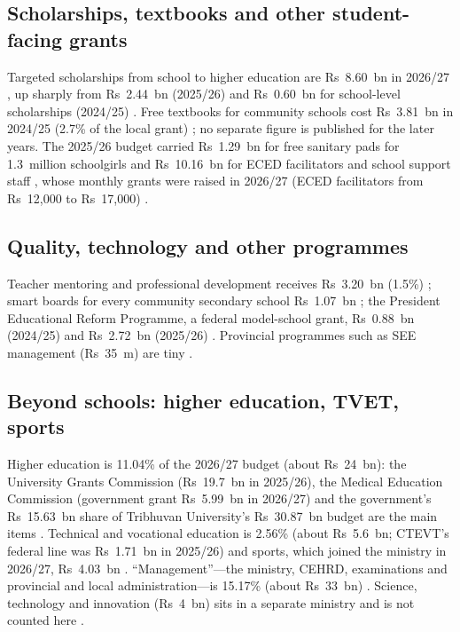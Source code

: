 \documentclass[11pt,a4paper]{article}
\begin{document}
\subsection{Scholarships, textbooks and other student-facing grants}
Targeted scholarships from school to higher education are Rs~8.60~bn in 2026/27 \cite{mof2026}, up sharply from Rs~2.44~bn (2025/26) and Rs~0.60~bn for school-level scholarships (2024/25) \cite{edusanjal2025,edusanjal2024b}. Free textbooks for community schools cost Rs~3.81~bn in 2024/25 (2.7\% of the local grant) \cite{kp2024dec}; no separate figure is published for the later years. The 2025/26 budget carried Rs~1.29~bn for free sanitary pads for 1.3~million schoolgirls and Rs~10.16~bn for ECED facilitators and school support staff \cite{edusanjal2025}, whose monthly grants were raised in 2026/27 (ECED facilitators from Rs~12,000 to Rs~17,000) \cite{ratopati_pay2026}.

\subsection{Quality, technology and other programmes}
Teacher mentoring and professional development receives Rs~3.20~bn (1.5\%) \cite{khabarhub2026}; smart boards for every community secondary school Rs~1.07~bn \cite{republica_budget2026}; the President Educational Reform Programme, a federal model-school grant, Rs~0.88~bn (2024/25) and Rs~2.72~bn (2025/26) \cite{edusanjal2024b,nce2025}. Provincial programmes such as SEE management (Rs~35~m) are tiny \cite{republica_budget2026}.

\subsection{Beyond schools: higher education, TVET, sports}
Higher education is 11.04\% of the 2026/27 budget (about Rs~24~bn): the University Grants Commission (Rs~19.7~bn in 2025/26), the Medical Education Commission (government grant Rs~5.99~bn in 2026/27) and the government's Rs~15.63~bn share of Tribhuvan University's Rs~30.87~bn budget are the main items \cite{ratopati2026,nce2025,ekantipur_mec2026,ratopati_tu2026}. Technical and vocational education is 2.56\% (about Rs~5.6~bn; CTEVT's federal line was Rs~1.71~bn in 2025/26) and sports, which joined the ministry in 2026/27, Rs~4.03~bn \cite{ratopati2026,nce2025,mof2026}. ``Management''---the ministry, CEHRD, examinations and provincial and local administration---is 15.17\% (about Rs~33~bn) \cite{ratopati2026}. Science, technology and innovation (Rs~4~bn) sits in a separate ministry and is not counted here \cite{mof2026}.
\end{document}

